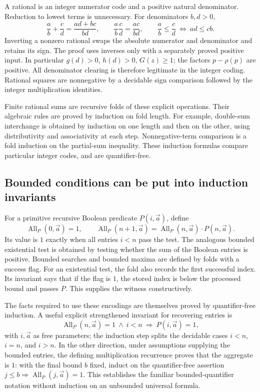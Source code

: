 A rational is an integer numerator code and a positive natural denominator.
Reduction to lowest terms is unnecessary. For denominators \(b,d>0\),
\[
 \frac ab+\frac cd=\frac{ad+bc}{bd},\qquad
 \frac ab\frac cd=\frac{ac}{bd},\qquad
 \frac ab\le\frac cd\ \Longleftrightarrow\ ad\le cb.
\]
Inverting a nonzero rational swaps the absolute numerator and denominator
and retains its sign. The proof uses inverses only with a separately proved
positive input. In particular \(g(d)>0\), \(h(d)>0\), \(G(z)\ge1\);
the factors \(p-\rho(p)\) are positive.
All denominator clearing is therefore legitimate in the integer coding.
Rational squares are nonnegative by a decidable sign comparison followed
by the integer multiplication identities.

Finite rational sums are recursive folds of these explicit operations.
Their algebraic rules are proved by induction on fold length.
For example, double-sum interchange is obtained by induction on one
length and then on the other, using distributivity and associativity at
each step. Nonnegative-term comparison is a fold induction on the
partial-sum inequality. These induction formulas compare particular
integer codes, and are quantifier-free.

\subsection{Bounded conditions can be put into induction invariants}

For a primitive recursive Boolean predicate \(P(i,\vec a)\), define
\[
 \operatorname{All}_P(0,\vec a)=1,\qquad
 \operatorname{All}_P(n+1,\vec a)
   =\operatorname{All}_P(n,\vec a)\cdot P(n,\vec a).
\]
Its value is \(1\) exactly when all entries \(i<n\) pass the test.
The analogous bounded existential test is obtained by testing whether the
sum of the Boolean entries is positive. Bounded searches and bounded
maxima are defined by folds with a success flag. For an existential test,
the fold also records the first successful index. Its invariant says that
if the flag is \(1\), the stored index is below the processed bound and
passes \(P\). This supplies the witness constructively.

The facts required to use these encodings are themselves proved by
quantifier-free induction. A useful explicit strengthened invariant for
recovering entries is
\[
 \operatorname{All}_P(n,\vec a)=1\ \wedge\ i<n
       \ \Longrightarrow\ P(i,\vec a)=1,
\]
with \(i,\vec a\) as free parameters; the induction step splits the
decidable cases \(i<n\), \(i=n\), and \(i>n\).
In the other direction, under assumptions supplying the bounded entries,
the defining multiplication recurrence proves that the aggregate is \(1\):
with the final bound \(b\) fixed, induct on the quantifier-free assertion
\(j\le b\Rightarrow\operatorname{All}_P(j,\vec a)=1\).
This establishes the familiar bounded-quantifier notation without
induction on an unbounded universal formula.

